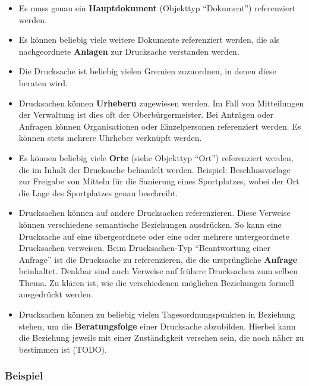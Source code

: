 \documentclass[,a4paper]{article}
\begin{document}
\begin{itemize}
\item
  Es muss genau ein \textbf{Hauptdokument} (Objekttyp ``Dokument'')
  referenziert werden.
\item
  Es können beliebig viele weitere Dokumente referenziert werden, die
  als nachgeordnete \textbf{Anlagen} zur Drucksache verstanden werden.
\item
  Die Drucksache ist beliebig vielen Gremien zuzuordnen, in denen diese
  beraten wird.
\item
  Drucksachen können \textbf{Urhebern} zugewiesen werden. Im Fall von
  Mitteilungen der Verwaltung ist dies oft der Oberbürgermeister. Bei
  Anträgen oder Anfragen können Organisationen oder Einzelpersonen
  referenziert werden. Es können stets mehrere Uhrheber verknüpft
  werden.
\item
  Es können beliebig viele \textbf{Orte} (siehe Objekttyp ``Ort'')
  referenziert werden, die im Inhalt der Drucksache behandelt werden.
  Beispiel: Beschlussvorlage zur Freigabe von Mitteln für die Sanierung
  eines Sportplatzes, wobei der Ort die Lage des Sportplatzes genau
  beschreibt.
\item
  Drucksachen können auf andere Drucksachen referenzieren. Diese
  Verweise können verschiedene semantische Beziehungen ausdrücken. So
  kann eine Drucksache auf eine übergeordnete oder eine oder mehrere
  untergeordnete Drucksachen verweisen. Beim Drucksachen-Typ
  ``Beantwortung einer Anfrage'' ist die Drucksache zu referenzieren,
  die die ursprüngliche \textbf{Anfrage} beinhaltet. Denkbar sind auch
  Verweise auf frühere Drucksachen zum selben Thema. Zu klären ist, wie
  die verschiedenen möglichen Beziehungen formell ausgedrückt werden.
\item
  Drucksachen können zu beliebig vielen Tagesordnungspunkten in
  Beziehung stehen, um die \textbf{Beratungsfolge} einer Drucksache
  abzubilden. Hierbei kann die Beziehung jeweils mit einer Zuständigkeit
  versehen sein, die noch näher zu bestimmen ist (TODO).
\end{itemize}

\subsubsection{Beispiel}
\end{document}
